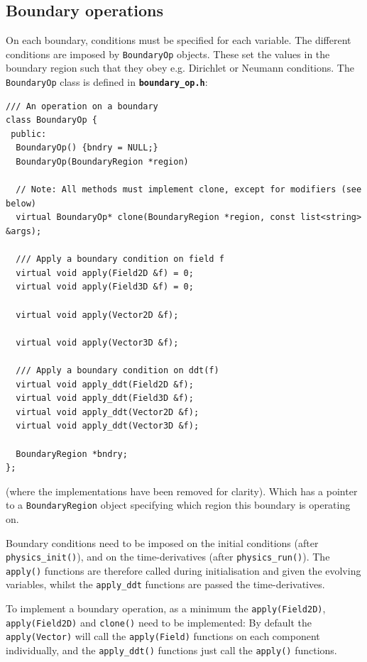 \documentclass[12pt]{article}
\newcommand{\code}[1]{\texttt{#1}}
\newcommand{\file}[1]{\texttt{\bf #1}}
\begin{document}
\subsection{Boundary operations}

On each boundary, conditions must be specified for each variable. 
The different conditions are imposed by \code{BoundaryOp} objects.
These set the values in the boundary region such that they obey e.g.
Dirichlet or Neumann conditions. The \code{BoundaryOp} class is defined
in \file{boundary\_op.h}: 
\begin{lstlisting}[firstnumber=21]
/// An operation on a boundary
class BoundaryOp {
 public:
  BoundaryOp() {bndry = NULL;}
  BoundaryOp(BoundaryRegion *region)
  
  // Note: All methods must implement clone, except for modifiers (see below)
  virtual BoundaryOp* clone(BoundaryRegion *region, const list<string> &args);
  
  /// Apply a boundary condition on field f
  virtual void apply(Field2D &f) = 0;
  virtual void apply(Field3D &f) = 0;
  
  virtual void apply(Vector2D &f);
  
  virtual void apply(Vector3D &f);

  /// Apply a boundary condition on ddt(f)
  virtual void apply_ddt(Field2D &f);
  virtual void apply_ddt(Field3D &f);
  virtual void apply_ddt(Vector2D &f);
  virtual void apply_ddt(Vector3D &f);
  
  BoundaryRegion *bndry;
};
\end{lstlisting}
(where the implementations have been removed for clarity). 
Which has a pointer to a \code{BoundaryRegion} object specifying which
region this boundary is operating on.

Boundary conditions need to be imposed on the initial conditions (after
\code{physics\_init()}), and on the time-derivatives
(after \code{physics\_run()}). The \code{apply()} functions are therefore
called during initialisation and given the evolving variables, whilst the
\code{apply\_ddt} functions are passed the time-derivatives.

To implement a boundary operation, as a minimum the \code{apply(Field2D)}, 
\code{apply(Field2D)} and \code{clone()} need to be implemented: By default
the \code{apply(Vector)} will call the \code{apply(Field)} functions on each
component individually, and the \code{apply\_ddt()} functions just call
the \code{apply()} functions.
\end{document}
